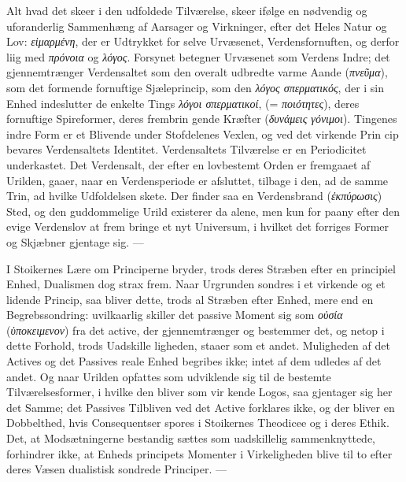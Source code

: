 \documentclass[12pt,a4paper]{book}
\newcommand{\gk}[1]{\textit{#1}}
\begin{document}
Alt hvad det skeer i den udfoldede Tilværelse, skeer ifølge
en nødvendig og uforanderlig Sammenhæng af Aarsager og
Virkninger, efter det Heles Natur og Lov: \gk{εἱμαρμένη}, der er
Udtrykket for selve Urvæsenet, Verdensfornuften, og derfor liig
med \gk{πρόνοια} og \gk{λόγος}. Forsynet betegner Urvæsenet som
Verdens Indre; det gjennemtrænger Verdensaltet som den
overalt udbredte varme Aande (\gk{πνεῦμα}), som det formende
fornuftige Sjæleprincip, som den \gk{λόγος σπερματικός}, der i sin
Enhed indeslutter de enkelte Tings \gk{λόγοι σπερματικοί},
(= \gk{ποιότητες}), deres fornuftige Spireformer, deres frembrin\-%
gende Kræfter (\gk{δυνάμεις γόνιμοι}). Tingenes indre Form er et
Blivende under Stofdelenes Vexlen, og ved det virkende Prin\-%
cip bevares Verdensaltets Identitet. Verdensaltets Tilværelse
er en Periodicitet underkastet. Det Verdensalt, der efter en
lovbestemt Orden er fremgaaet af Urilden, gaaer, naar en
Verdensperiode er afsluttet, tilbage i den, ad de samme Trin,
ad hvilke Udfoldelsen skete. Der finder saa en Verdensbrand
(\gk{ἐκπύρωσις}) Sted, og den guddommelige Urild existerer da
alene, men kun for paany efter den evige Verdenslov at frem\-%
bringe et nyt Universum, i hvilket det forriges Former og
Skjæbner gjentage sig. ---

I Stoikernes Lære om Principerne bryder, trods deres
Stræben efter en principiel Enhed, Dualismen dog strax frem.
Naar Urgrunden sondres i et virkende og et lidende Princip,
saa bliver dette, trods al Stræben efter Enhed, mere end en
Begrebssondring: uvilkaarlig skiller det passive Moment sig
som \gk{οὐσία} (\gk{ὑποκειμενον}) fra det active, der gjennemtrænger
og bestemmer det, og netop i dette Forhold, trods Uadskille\-%
ligheden, staaer som et andet. Muligheden af det Actives og
det Passives reale Enhed begribes ikke; intet af dem udledes
af det andet. Og naar Urilden opfattes som udviklende sig
til de bestemte Tilværelsesformer, i hvilke den bliver som vir\-%
kende Logos, saa gjentager sig her det Samme; det Passives
Tilbliven ved det Active forklares ikke, og der bliver en
Dobbelthed, hvis Consequentser spores i Stoikernes Theodicee
og i deres Ethik. Det, at Modsætningerne bestandig sættes
som uadskillelig sammenknyttede, forhindrer ikke, at Enheds\-%
principets Momenter i Virkeligheden blive til to efter deres
Væsen dualistisk sondrede Principer. ---
\end{document}
